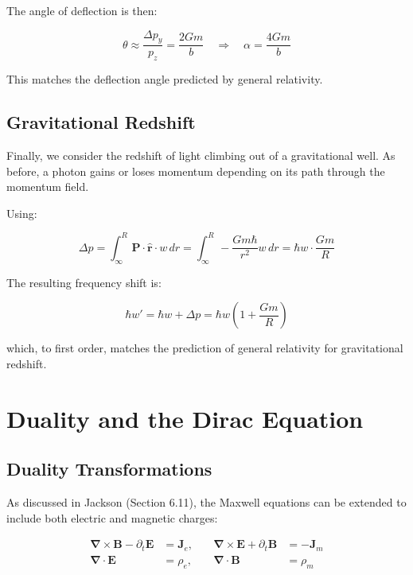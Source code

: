 \documentclass {article}
\renewcommand\vec{\mathbf}
\let\OldS\nabla
\renewcommand{\nabla}{\boldsymbol{\OldS}}
\let\OldHat\hat
\renewcommand{\hat}[1]{\OldHat{\mathbf{#1}}}
\begin{document}
The angle of deflection is then:

\begin{equation}
\theta \approx \frac{\Delta p_y}{p_z} = \frac{2 G m}{b} \quad \Rightarrow \quad \alpha = \frac{4 G m}{b}
\end{equation}

This matches the deflection angle predicted by general relativity.

\subsection{Gravitational Redshift}

Finally, we consider the redshift of light climbing out of a gravitational well. As before, a photon gains or loses momentum depending on its path through the momentum field.

Using:

\begin{equation}
\Delta p = \int_{\infty}^{R} \vec{P} \cdot \hat{r} \cdot w \, dr = \int_{\infty}^{R} - \frac{G m \hbar}{r^2} w \, dr = \hbar w \cdot \frac{G m}{R}
\end{equation}

The resulting frequency shift is:

\begin{equation}
\hbar w' = \hbar w + \Delta p = \hbar w \left( 1 + \frac{G m}{R} \right)
\end{equation}

which, to first order, matches the prediction of general relativity for gravitational redshift.

		
\section{Duality and the Dirac Equation}

\subsection{Duality Transformations}

As discussed in Jackson (Section 6.11), the Maxwell equations can be extended to include both electric and magnetic charges:

\begin{equation}
\begin{aligned}
\nabla \times \vec{B} - \partial_t \vec{E} &= \vec{J}_e, \quad
&\nabla \times \vec{E} + \partial_t \vec{B} &= -\vec{J}_m \\
\nabla \cdot \vec{E} &= \rho_e, \quad
&\nabla \cdot \vec{B} &= \rho_m
\end{aligned}
\end{equation}
\end{document}
